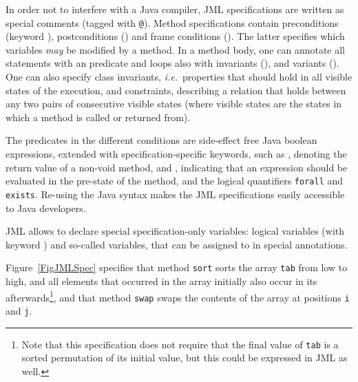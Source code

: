 In order not to interfere with a Java compiler, JML
specifications are written as special comments (tagged with
\texttt{@}). Method specifications contain preconditions (keyword
), postconditions () and frame
conditions (). The latter specifies which variables
\emph{may} be modified by a method. In a method body, one can
annotate all statements with an  predicate and loops
also with invariants (), and variants
(). One can also specify class invariants,
\emph{i.e.}\ properties that should hold in all visible states of the
execution, and constraints, describing a relation that 
holds between any two pairs of consecutive visible states (where
visible states are the states in which a method is called or returned
from).

The predicates in the different conditions are side-effect free Java
boolean expressions, extended with specification-specific keywords,
such as , denoting the return value of a non-void
method, and , indicating that an expression should be
evaluated in the pre-state of the method, and the logical quantifiers
\texttt{\bsl forall} and \texttt{\bsl exists}. Re-using the Java syntax
makes the JML specifications easily accessible to Java developers.

JML allows to declare special specification-only variables: logical
variables (with keyword ) and so-called 
variables, that can be assigned to in special 
annotations. 

Figure~\ref{FigJMLSpec} specifies that method \texttt{sort} sorts the
array \texttt{tab} from low to high, and all elements that occurred in
the array initially also occur in its afterwards\footnote{Note that
this specification does not require that the final value of
\texttt{tab} is a sorted permutation of its initial value, but this
could be expressed in JML as well.}, and that method
\texttt{swap} swaps the contents of the array at positions \texttt{i}
and \texttt{j}. 

